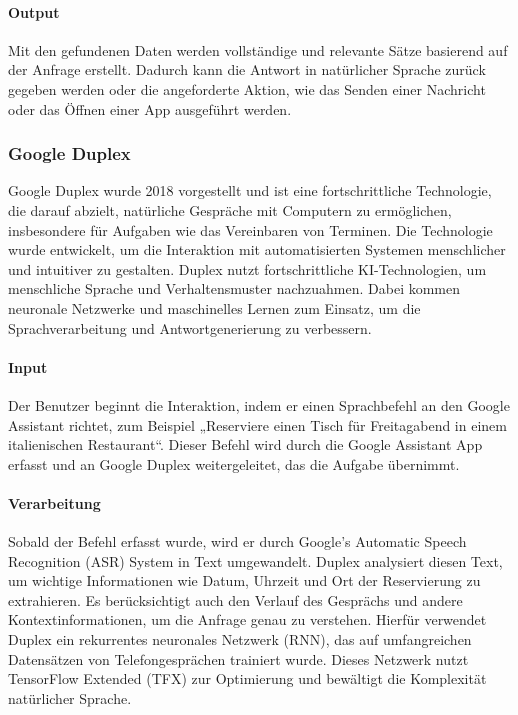 \documentclass[conference]{IEEEtran}
\begin{document}
\paragraph{Output} Mit den gefundenen Daten werden vollständige und relevante Sätze basierend auf der Anfrage erstellt.  Dadurch kann die Antwort in natürlicher Sprache zurück gegeben werden oder die angeforderte Aktion, wie das Senden einer Nachricht oder das Öffnen einer App ausgeführt werden.
\cite{noauthor_voice_nodate}
\cite{noauthor_hey_nodate}
 
\subsubsection{Google Duplex}
Google Duplex wurde 2018 vorgestellt und ist eine fortschrittliche Technologie, die darauf abzielt, natürliche Gespräche mit Computern zu ermöglichen, insbesondere für Aufgaben wie das Vereinbaren von Terminen. Die Technologie wurde entwickelt, um die Interaktion mit automatisierten Systemen menschlicher und intuitiver zu gestalten. Duplex nutzt fortschrittliche KI-Technologien, um menschliche Sprache und Verhaltensmuster nachzuahmen. Dabei kommen neuronale Netzwerke und maschinelles Lernen zum Einsatz, um die Sprachverarbeitung und Antwortgenerierung zu verbessern.

\paragraph{Input} Der Benutzer beginnt die Interaktion, indem er einen Sprachbefehl an den Google Assistant richtet, zum Beispiel „Reserviere einen Tisch für Freitagabend in einem italienischen Restaurant“. Dieser Befehl wird durch die Google Assistant App erfasst und an Google Duplex weitergeleitet, das die Aufgabe übernimmt.

\paragraph{Verarbeitung} Sobald der Befehl erfasst wurde, wird er durch Google’s Automatic Speech Recognition (ASR) System in Text umgewandelt. Duplex analysiert diesen Text, um wichtige Informationen wie Datum, Uhrzeit und Ort der Reservierung zu extrahieren. Es berücksichtigt auch den Verlauf des Gesprächs und andere Kontextinformationen, um die Anfrage genau zu verstehen. Hierfür verwendet Duplex ein rekurrentes neuronales Netzwerk (RNN), das auf umfangreichen Datensätzen von Telefongesprächen trainiert wurde. Dieses Netzwerk nutzt TensorFlow Extended (TFX) zur Optimierung und bewältigt die Komplexität natürlicher Sprache.
\end{document}
